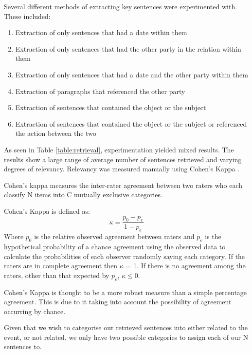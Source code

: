 \documentclass[bsc,frontabs,twoside,singlespacing,parskip,deptreport]{infthesis}     %
\begin{document}
Several different methods of extracting key sentences were experimented with.
These included:
\begin{enumerate}
  \item Extraction of only sentences that had a date within them
  \item Extraction of only sentences that had the other party in the relation within them
  \item Extraction of only sentences that had a date and the other party within them
  \item Extraction of paragraphs that referenced the other party
  \item Extraction of sentences that contained the object or the subject 
  \item Extraction of sentences that contained the object or the subject or referenced the action between the two 
\end{enumerate}


As seen in Table \ref{table:retrieval}, experimentation yielded mixed results.
The results show a large range of average number of sentences retrieved and varying degrees of relevancy.
Relevancy was measured manually using Cohen's Kappa \cite{wood2007understanding}.

Cohen's kappa measures the inter-rater agreement between two raters
who each classify N items into C mutually exclusive categories.

Cohen's Kappa is defined as:\\
\begin{equation}
  \kappa = \frac{p_{0} - p_{e}}{1 - p_{e}}\nonumber
\end{equation}
Where $p_0$ is the relative observed agreement between raters and $p_e$ is the hypothetical probability
of a chance agreement using the observed data to calculate the probabilities of each observer randomly saying each category.
If the raters are in complete agreement then $\kappa$ = 1.
If there is no agreement among the raters, other than that expected by $p_e$, $\kappa \leq 0$.

Cohen's Kappa is thought to be a more robust measure than a simple percentage agreement.
This is due to it taking into account the possibility of agreement occurring by chance.


Given that we wish to categorise our retrieved sentences into either related to the event, or not related,
we only have two possible categories to assign each of our N sentences to.
\end{document}

